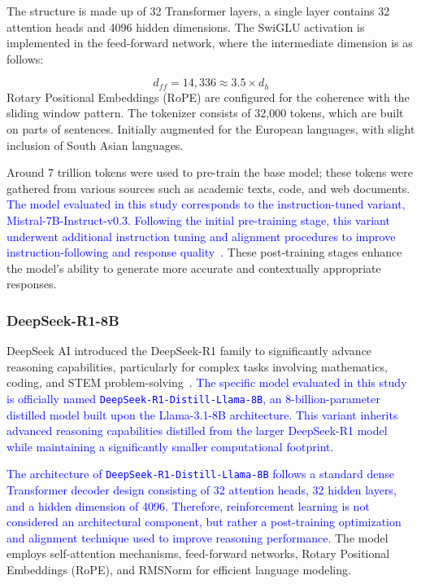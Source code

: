\documentclass[10pt,letterpaper]{article}
\newcommand{\rev}[1]{\textcolor{blue}{#1}}
\begin{document}
The structure is made up of 32 Transformer layers, a single layer contains 32 attention heads and 4096 hidden dimensions. The SwiGLU activation is implemented in the feed-forward network, where the intermediate dimension is as follows: 

\begin{equation}
d_{ff} = 14{,}336 \approx 3.5 \times d_h
\label{eq:mistral_ffn}
\end{equation}
Rotary Positional Embeddings (RoPE) are configured for the coherence with the sliding window pattern. The tokenizer consists of 32,000 tokens, which are built on parts of sentences. Initially augmented for the European languages, with slight inclusion of South Asian languages. 

Around 7 trillion tokens were used to pre-train the base model; these tokens were gathered from various sources such as academic texts, code, and web documents. \rev{The model evaluated in this study corresponds to the instruction-tuned variant, Mistral-7B-Instruct-v0.3. Following the initial pre-training stage, this variant underwent additional instruction tuning and alignment procedures to improve instruction-following and response quality~\cite{b37}.} These post-training stages enhance the model’s ability to generate more accurate and contextually appropriate responses.


\subsubsection*{DeepSeek-R1-8B}

DeepSeek AI introduced the DeepSeek-R1 family to significantly advance reasoning capabilities, particularly for complex tasks involving mathematics, coding, and STEM problem-solving~\cite{b38}. \rev{The specific model evaluated in this study is officially named \texttt{DeepSeek-R1-Distill-Llama-8B}, an 8-billion-parameter distilled model built upon the Llama-3.1-8B architecture. This variant inherits advanced reasoning capabilities distilled from the larger DeepSeek-R1 model while maintaining a significantly smaller computational footprint.}

\rev{The architecture of \texttt{DeepSeek-R1-Distill-Llama-8B} follows a standard dense Transformer decoder design consisting of 32 attention heads, 32 hidden layers, and a hidden dimension of 4096. Therefore, reinforcement learning is not considered an architectural component, but rather a post-training optimization and alignment technique used to improve reasoning performance.} The model employs self-attention mechanisms, feed-forward networks, Rotary Positional Embeddings (RoPE), and RMSNorm for efficient language modeling.
\end{document}

